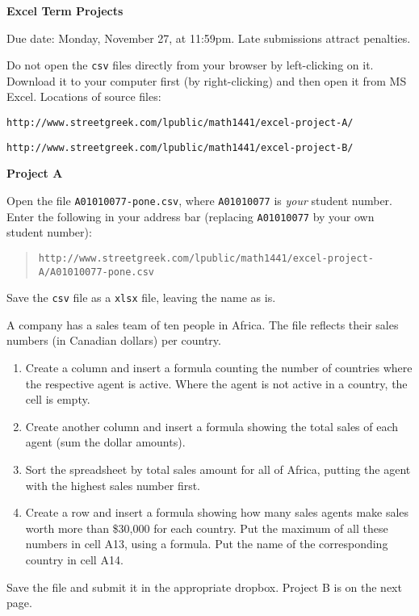 \documentclass[11pt]{article}
\begin{document}
\textbf{Excel Term Projects}

Due date: Monday, November 27, at 11:59pm. Late submissions attract
penalties.

Do not open the \texttt{csv} files directly from your browser by
left-clicking on it. Download it to your computer first (by
right-clicking) and then open it from MS Excel. Locations of source
files:

\texttt{http://www.streetgreek.com/lpublic/math1441/excel-project-A/}

\texttt{http://www.streetgreek.com/lpublic/math1441/excel-project-B/}

\textbf{Project A}

Open the file \texttt{A01010077-pone.csv}, where \texttt{A01010077} is
\emph{your} student number. Enter the following in your address bar
(replacing \texttt{A01010077} by your own student number):

\begin{quote}
  \texttt{http://www.streetgreek.com/lpublic/math1441/excel-project-A/A01010077-pone.csv}
\end{quote}

Save the \texttt{csv} file as a \texttt{xlsx} file, leaving the name
as is.

A company has a sales team of ten people in Africa. The file reflects
their sales numbers (in Canadian dollars) per country.

\begin{enumerate}
\item Create a column and insert a formula counting the number of countries
where the respective agent is active. Where the agent is not active in
a country, the cell is empty.
\item Create another column and insert a formula showing the total sales of
  each agent (sum the dollar amounts).
\item Sort the spreadsheet by total sales amount for all of Africa,
  putting the agent with the highest sales number first.
\item Create a row and insert a formula showing how many sales agents
  make sales worth more than \$30,000 for each country. Put the
  maximum of all these numbers in cell A13, using a formula. Put the
  name of the corresponding country in cell A14.
\end{enumerate}

Save the file and submit it in the appropriate dropbox. Project B is
on the next page.

\newpage
\end{document}
